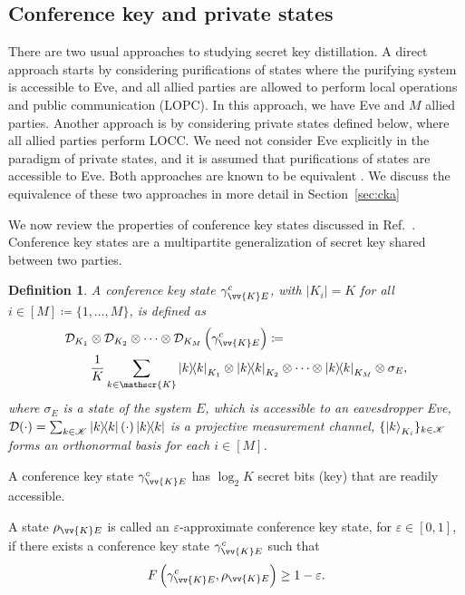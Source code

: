 \documentclass[aps,pra,twocolumn,superscriptaddress,longbibliography]{revtex4-1}
\def\({\left(}
\def\){\right)}
\newcommand{\msc}[1]{\mathscr{#1}}
\newtheorem{definition}{Definition}
\begin{document}
\fi


\subsection{Conference key and private states}\label{sec:rev-ck-ps}
There are two usual approaches to studying secret key distillation. A direct approach starts by considering purifications of states where the purifying system is accessible to Eve, and all allied parties are allowed to perform local operations and public communication (LOPC). In this approach, we have Eve and $M$ allied parties. Another approach is by considering private states defined below, where all allied parties perform LOCC. We need not consider Eve explicitly in the paradigm of private states, and it is assumed that purifications of states are accessible to Eve. Both approaches are known to be equivalent \cite{HHHO05}. We discuss the equivalence of these two approaches in more detail in Section~\ref{sec:cka}
 
We now review the properties of conference key states discussed in Ref.~\cite{AH09}. Conference key states are a multipartite generalization of secret key shared between two parties.   

\begin{definition}\label{def:key-state}
A conference key state $\gamma^c_{\vv{K}E}$, with $|K_i|=K$ for all $i\in[M]\coloneqq\{1,…,M\}$, is defined as 
\begin{align}
& \mathcal{D}_{K_1}\otimes\mathcal{D}_{K_2}\otimes\cdots\otimes \mathcal{D}_{K_M}\left(\gamma^c_{\vv{K} E}\right) \coloneqq \nonumber \\ 
&\qquad \frac{1}{K}\sum_{k\in\msc{K}}\op{k}_{K_1}\otimes \op{k}_{K_2}\otimes\cdots \otimes \op{k}_{K_M}\otimes\sigma_E, \label{eq:key-state}
\end{align}
where $\sigma_E$ is a state of the system $E$, which is accessible to an eavesdropper Eve, $\mathcal{D}(\cdot)=\sum_{k\in\msc{K}}\op{k}(\cdot)\op{k}$ is a projective measurement channel, $\{\ket{k}_{K_i}\}_{k\in\msc{K}}$ forms an orthonormal basis for each $i\in[M]$. 
\end{definition}
A conference key state $\gamma^c_{\vv{K} E}$ has $\log_2K$ secret bits (key) that are readily accessible. 

A state $\rho_{\vv{K}E}$ is called an $\varepsilon$-approximate conference key state, for $\varepsilon\in[0,1]$, if there exists a conference key state $\gamma^c_{\vv{K} E}$ such that~\cite{AH09}
\begin{equation}
F\(\gamma^c_{\vv{K} E},\rho_{\vv{K}E}\)\geq 1-\varepsilon. 
\end{equation} 
\end{document}
